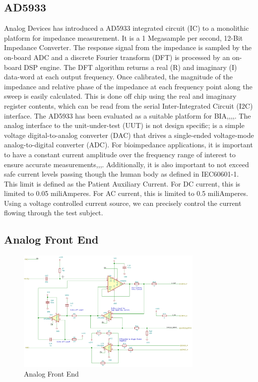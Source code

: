 \documentclass[]{IEEEtran}
\begin{document}
\subsection{AD5933}
Analog Devices has introduced a AD5933 integrated circuit (IC) to a monolithic platform for impedance measurement. It is a 1 Megasample per second, 12-Bit Impedance Converter\cite{noauthor_ad5933_nodate}. The response signal from the impedance is sampled by the on-board ADC and a discrete Fourier transform (DFT) is processed by an on-board DSP engine. The DFT algorithm returns a real (R) and imaginary (I) data-word at each output frequency. Once calibrated, the magnitude of the impedance and relative phase of the impedance at each frequency point along the sweep is easily calculated. This is done off chip using the real and imaginary register contents, which can be read from the serial Inter-Integrated Circuit (I2C) interface.\newline
The AD5933 has been evaluated as a suitable platform for BIA\cite{breniuc_wearable_2014},\cite{ferreira_ad5933-based_2011},\cite{harder_smart_2016},\cite{bakr_aging_2016},\cite{pliquett_interfacing_2012}. The analog interface to the unit-under-test (UUT) is not design specific; is a simple voltage digital-to-analog converter (DAC) that drives a single-ended voltage-mode analog-to-digital converter (ADC). For bioimpedance applications, it is important to have a constant current amplitude over the frequency range of interest to ensure accurate measurements\cite{bertemes-filho_mirrored_2012},\cite{seoane_analog_2008},\cite{pliquett_interfacing_2012},\cite{bera_battery-based_2013}. Additionally, it is also important to not exceed safe current levels passing though the human body as defined in IEC60601-1\cite{noauthor_iec_nodate}. This limit is defined as the Patient Auxiliary Current. For DC current, this is limited to 0.05 miliAmperes. For AC current, this is limited to 0.5 miliAmperes. Using a voltage controlled current source, we can precisely control the current flowing through the test subject. 

\subsection{Analog Front End}

\begin{figure} %
\centering
\includegraphics[width=9cm ]{./graphics/front_end.png}
\centering
\caption{Analog Front End}
\label{fig:front_end}
\end{figure}
\end{document}

